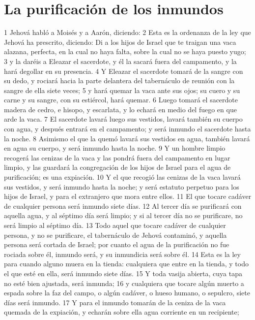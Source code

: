 \section*{La purificación de los inmundos}

1 Jehová habló a Moisés y a Aarón, diciendo:
2 Esta es la ordenanza de la ley que Jehová ha prescrito, diciendo: Di a los hijos de Israel que te traigan una vaca alazana, perfecta, en la cual no haya falta, sobre la cual no se haya puesto yugo;
3 y la daréis a Eleazar el sacerdote, y él la sacará fuera del campamento, y la hará degollar en su presencia.
4 Y Eleazar el sacerdote tomará de la sangre con su dedo, y rociará hacia la parte delantera del tabernáculo de reunión con la sangre de ella siete veces;
5 y hará quemar la vaca ante sus ojos; su cuero y su carne y su sangre, con su estiércol, hará quemar.
6 Luego tomará el sacerdote madera de cedro, e hisopo, y escarlata, y lo echará en medio del fuego en que arde la vaca.
7 El sacerdote lavará luego sus vestidos, lavará también su cuerpo con agua, y después entrará en el campamento; y será inmundo el sacerdote hasta la noche.
8 Asimismo el que la quemó lavará sus vestidos en agua, también lavará en agua su cuerpo, y será inmundo hasta la noche.
9 Y un hombre limpio recogerá las cenizas de la vaca y las pondrá fuera del campamento en lugar limpio, y las guardará la congregación de los hijos de Israel para el agua de purificación; es una expiación.
10 Y el que recogió las cenizas de la vaca lavará sus vestidos, y será inmundo hasta la noche; y será estatuto perpetuo para los hijos de Israel, y para el extranjero que mora entre ellos.
11 El que tocare cadáver de cualquier persona será inmundo siete días.
12 Al tercer día se purificará con aquella agua, y al séptimo día será limpio; y si al tercer día no se purificare, no será limpio al séptimo día.
13 Todo aquel que tocare cadáver de cualquier persona, y no se purificare, el tabernáculo de Jehová contaminó, y aquella persona será cortada de Israel; por cuanto el agua de la purificación no fue rociada sobre él, inmundo será, y su inmundicia será sobre él.
14 Esta es la ley para cuando alguno muera en la tienda: cualquiera que entre en la tienda, y todo el que esté en ella, será inmundo siete días.
15 Y toda vasija abierta, cuya tapa no esté bien ajustada, será inmunda;
16 y cualquiera que tocare algún muerto a espada sobre la faz del campo, o algún cadáver, o hueso humano, o sepulcro, siete días será inmundo.
17 Y para el inmundo tomarán de la ceniza de la vaca quemada de la expiación, y echarán sobre ella agua corriente en un recipiente;
